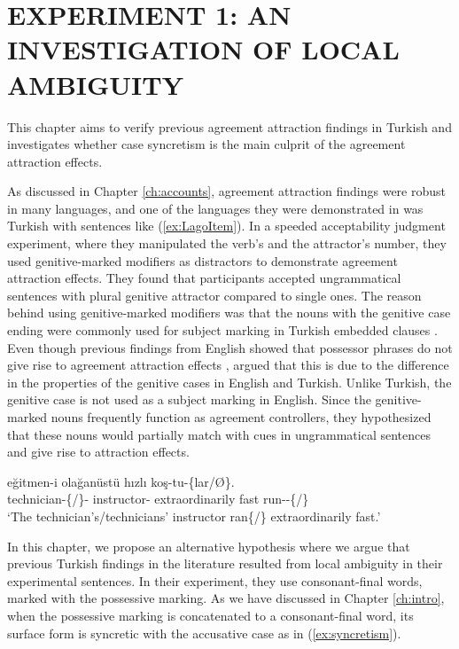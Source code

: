 \chapter{EXPERIMENT 1: AN INVESTIGATION OF LOCAL AMBIGUITY} \label{ch:exp1}

This chapter aims to verify previous agreement attraction findings in Turkish and investigates whether case syncretism is the main culprit of the agreement attraction effects. 

As discussed in Chapter \ref{ch:accounts}, agreement attraction findings were robust in many languages, and one of the languages they were demonstrated in was Turkish \citep{LagoEtAl2019} with sentences like (\ref{ex:LagoItem}). In a speeded acceptability judgment experiment, where they manipulated the verb's and the attractor's number, they used genitive-marked modifiers as distractors to demonstrate agreement attraction effects. They found that participants accepted ungrammatical sentences with plural genitive attractor compared to single ones.  The reason behind using genitive-marked modifiers was that the nouns with the genitive case ending were commonly used for subject marking in Turkish embedded clauses \citep{GokselKerslake2005,Kornfilt:2011}. Even though previous findings from English showed that possessor phrases do not give rise to agreement attraction effects \citep{NicolEtAl:2016}, \citeauthor{LagoEtAl2019} argued that this is due to the difference in the properties of the genitive cases in English and Turkish. Unlike Turkish, the genitive case is not used as a subject marking in English. Since the genitive-marked nouns frequently function as agreement controllers, they hypothesized that these nouns would partially match with cues in ungrammatical sentences and give rise to attraction effects. 

\ea \label{ex:LagoItem}
     {e\u{g}itmen-i} ola\u{g}an{\"u}st{\"u} h{\i}zl{\i} ko\c{s}-tu-\{lar/\O\}.\\
    technician-\{\Pl/\Sg\}-\Gen{} instructor-\Poss{} extraordinarily fast run-\Pst-\{\Pl/\Sg\}\\
    \glt `The technician's/technicians' instructor ran\{\Pl/\Sg\} extraordinarily fast.'
\z

In this chapter, we propose an alternative hypothesis where we argue that previous Turkish findings in the literature resulted from local ambiguity in their experimental sentences. In their experiment, they use consonant-final words, marked with the possessive marking. As we have discussed in Chapter \ref{ch:intro}, when the possessive marking is concatenated to a consonant-final word, its surface form is syncretic with the accusative case as in (\ref{ex:syncretism}). 

